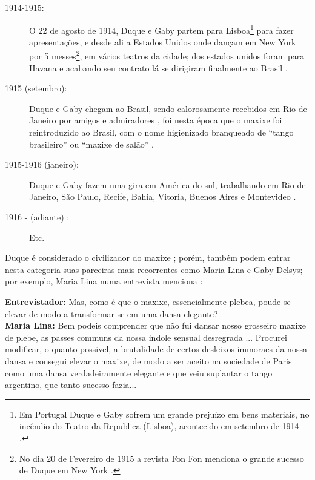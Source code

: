 \begin{description}
\item[1914-1915:] O 22 de agosto de 1914, Duque e Gaby 
partem para Lisboa\footnote{Em Portugal Duque e Gaby sofrem um grande prejuízo em bens materiais, 
no incêndio do Teatro da Republica (Lisboa), acontecido em setembro de 1914 \cite[pp. 4]{maxixe1914duque:1}.}
 para fazer apresentações, 
e desde ali a Estados Unidos onde dançam em New York
por 5 messes\footnote{No 
dia 20 de Fevereiro de 1915 a revista Fon Fon menciona o grande sucesso de Duque em New York \cite[pp. 45]{maxixe1915duqueEEUU:1}.}, 
em vários teatros da cidade; 
dos estados unidos foram para Havana e acabando seu contrato lá  
se dirigiram finalmente ao Brasil \cite[pp. 6]{maxixe1916duquegaby:1} \cite[pp. 1]{maxixeparis1915:0}.

\item[1915 (setembro):] Duque e Gaby chegam ao Brasil, 
sendo calorosamente recebidos em Rio de Janeiro por amigos e admiradores 
\cite[pp. 1]{maxixeparis1915:0} \cite[pp. 2]{maxixeparis1915}  \cite[pp. 73-75]{shaw2018tropical},
foi nesta época que o maxixe foi reintroduzido ao Brasil, com o nome higienizado branqueado de 
``tango brasileiro'' ou ``maxixe de salão'' \cite[pp. 74-75]{shaw2018tropical}.

\item[1915-1916 (janeiro):] Duque e Gaby fazem uma gira em América do sul, 
trabalhando em Rio de Janeiro, São Paulo, Recife, Bahia, Vitoria, Buenos Aires e Montevideo
\cite[pp. 6]{maxixe1916duquegaby:1} \cite[pp. 5]{maxixe1916duquegaby:2}. 
\item[1916 - (adiante)  :] Etc.
\end{description}

Duque é considerado o civilizador do maxixe \cite[pp. 129]{efege1974maxixe};
porém, também podem entrar nesta categoria suas parceiras mais recorrentes como Maria Lina e Gaby Delsys;
por exemplo, Maria Lina numa entrevista menciona \cite[pp. 3]{maxixe1913marialina}:
\begin{citando}%
\textbf{Entrevistador:} Mas, como é que o maxixe, essencialmente plebea,
poude se elevar de modo a transformar-se em uma dansa elegante?\\
\textbf{Maria Lina:} Bem podeis comprender que não fui dansar nosso 
grosseiro maxixe de plebe,
as passes communs da nossa indole sensual desregrada ...
Procurei modificar, o quanto possivel,
a brutalidade de certos desleixos immoraes da nossa dansa 
e consegui elevar o maxixe,
de modo a ser aceito na sociedade de Paris como uma dansa 
verdadeiramente elegante e que veiu suplantar o tango argentino, 
que tanto sucesso fazia...
\end{citando}

